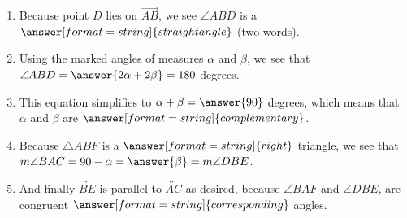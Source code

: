 \documentclass[nooutcomes]{ximera}
\begin{document}
\begin{problem}
\begin{problem}
\begin{problem}
\begin{enumerate}
\item Because point $D$ lies on $\overrightarrow{AB}$, we see $\angle ABD$ is a $\answer[format=string]{straight angle}$ (two words).  
\item Using the marked angles of measures $\alpha$ and $\beta$, we see that $\angle ABD = \answer{2\alpha + 2\beta} = 180$ degrees.  
\item This equation simplifies to $\alpha + \beta = \answer{90}$ degrees, which means that $\alpha$ and $\beta$ are $\answer[format=string]{complementary}$. 
\item Because $\triangle ABF$ is a $\answer[format=string]{right}$ triangle, we see that $m\angle BAC = 90 - \alpha = \answer{\beta} = m\angle DBE$.
\item And finally $\overleftrightarrow{BE}$ is parallel to  $\overleftrightarrow{AC}$ as desired, because $\angle BAF$ and $\angle DBE$, 
are congruent $\answer[format=string]{corresponding}$ angles.  
\end{enumerate}

\end{problem}
\end{problem}
\end{problem}
\end{document}
